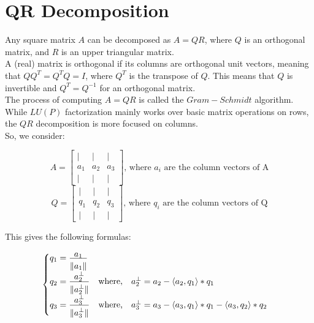 \section{QR Decomposition}

Any square matrix $A$ can be decomposed as $A=QR$, where $Q$ is an orthogonal matrix, and $R$ is an upper triangular matrix.
\\

A (real) matrix is orthogonal if its columns are orthogonal unit vectors, meaning that $QQ^T = Q^TQ = I$, where $Q^T$ is the transpose of $Q$. This means that $Q$ is invertible and $Q^T = Q^{-1}$ for an orthogonal matrix.
\\

The process of computing $A=QR$ is called the $Gram-Schmidt$ algorithm.
\\

While $LU(P)$ factorization mainly works over basic matrix operations on rows, the $QR$ decomposition is more focused on columns.
\\

So, we consider:

$$
A = 
\begin{bmatrix}
| & | & | \\
a_{1} & a_{2} & a_{3} \\
| & | & |
\end{bmatrix}
\text{, \ where } a_{i} \text{ are the column vectors of A}
$$
$$
Q = 
\begin{bmatrix}
| & | & | \\
q_{1} & q_{2} & q_{3} \\
| & | & |
\end{bmatrix}
\text{, \ where } q_{i} \text{ are the column vectors of Q}
$$

This gives the following formulas:

$$
\begin{cases}
q_{1} = \frac{\displaystyle a_{1}}{\displaystyle \rule{0mm}{4mm} \lVert a_{1} \rVert} \\[3mm]
q_{2} = \frac{\displaystyle a^{\bot}_{2}}{\displaystyle \rule{0mm}{4mm}\lVert a^{\bot}_{2} \rVert} \text{\quad where,\quad } a^{\bot}_{2} = a_{2} - \langle a_{2}, q_{1} \rangle * q_{1} \\[3mm]
q_{3} = \frac{\displaystyle a^{\bot}_{3}}{\displaystyle \rule{0mm}{4mm}\lVert a^{\bot}_{3} \rVert} \text{\quad where,\quad } a^{\bot}_{3} = a_{3} - \langle a_{3}, q_{1} \rangle * q_{1} - \langle a_{3}, q_{2} \rangle * q_{2}
\end{cases}
$$

